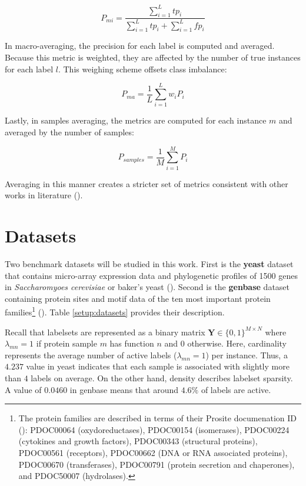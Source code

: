 \[
    P_{mi} = \dfrac{\sum_{i=1}^{L} tp_{i}}{\sum_{i=1}^{L} tp_{i} +
    \sum_{i=1}^{L} fp_{i}}
\]

\noindent In macro-averaging, the precision for each label is computed and
averaged. Because this metric is weighted, they are affected by
the number of true instances for each label $l$. This weighing scheme
offsets class imbalance:

\[
    P_{ma} = \dfrac{1}{L} \sum_{i=1}^{L} w_{i} P_{i}
\]

\noindent Lastly, in samples averaging, the metrics are computed for each
instance $m$ and averaged by the number of samples:

\[
    P_{samples} = \dfrac{1}{M}\sum_{i=1}^{M} P_{i}
\]

\noindent Averaging in this manner creates a stricter set of metrics
consistent with other works in literature (\cite{madjarov2012extensive,
gibaja2015tutorial, herrera2016multilabel, tsoumakas2017data}).

\section{Datasets}
\label{Datasets}

\par Two benchmark datasets will be studied in this work. First is the
\textbf{yeast} dataset that contains micro-array expression data and
phylogenetic profiles of 1500 genes in \textit{Saccharomyoes cerevisiae} or
baker's yeast (\cite{elisseeff2001kernel}). Second is the \textbf{genbase}
dataset containing protein sites and motif data of the ten most important
protein families\footnote[2]{The protein families are described in terms of
their Prosite documenation ID (\cite{diplaris2005protein,
bairoch1991prosite,hatzidamianos2003genminer}): PDOC00064 (oxydoreductases),
PDOC00154 (isomerases), PDOC00224 (cytokines and growth factors), PDOC00343
(structural proteins), PDOC00561 (receptors), PDOC00662 (DNA or RNA associated
proteins), PDOC00670 (transferases), PDOC00791 (protein secretion and
chaperones), and PDOC50007 (hydrolases).} (\cite{diplaris2005protein}). Table
\ref{setup:datasets} provides their description.

\par Recall that labelsets are represented as a binary matrix $\mathbf{Y} \in
\{0,1\}^{M \times N} $ where $\lambda_{mn} = 1$ if protein sample $m$ has
function $n$ and $0$ otherwise. Here, cardinality represents the average
number of active labels ($\lambda_{mn}=1$) per instance. Thus, a $4.237$ value
in yeast indicates that each sample is associated with slightly more than $4$
labels on average. On the other hand, density describes labelset sparsity. A
value of $0.0460$ in genbase means that around $4.6\%$ of labels are active.

